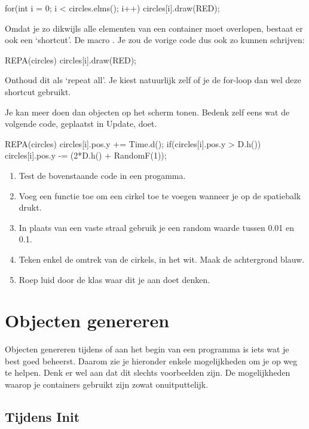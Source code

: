 \begin{code}
for(int i = 0; i < circles.elms(); i++)
{
  circles[i].draw(RED);
}
\end{code}

Omdat je zo dikwijls alle elementen van een container moet overlopen, bestaat er ook een `shortcut'. De macro . Je zou de vorige code dus ook zo kunnen schrijven:

\begin{code}
REPA(circles)
{
  circles[i].draw(RED);
}
\end{code}

Onthoud dit als `repeat all'. Je kiest natuurlijk zelf of je de for-loop dan wel deze shortcut gebruikt.

Je kan meer doen dan objecten op het scherm tonen. Bedenk zelf eens wat de volgende code, geplaatst in Update, doet.

\begin{code}
REPA(circles)
{
	circles[i].pos.y += Time.d();
	if(circles[i].pos.y > D.h()) {
	  circles[i].pos.y -= (2*D.h() + RandomF(1));
	}
}
\end{code}

\begin{exercise}
\begin{enumerate}
\item Test de bovenstaande code in een progamma.
\item Voeg een functie toe om een cirkel toe te voegen wanneer je op de spatiebalk drukt.
\item In plaats van een vaste straal gebruik je een random waarde tussen 0.01 en 0.1.
\item Teken enkel de omtrek van de cirkels, in het wit. Maak de achtergrond blauw.
\item Roep luid door de klas waar dit je aan doet denken.
\end{enumerate}
\end{exercise}

\section{Objecten genereren}
Objecten genereren tijdens of aan het begin van een programma is iets wat je best goed beheerst. Daarom zie je hieronder enkele mogelijkheden om je op weg te helpen. Denk er wel aan dat dit slechts voorbeelden zijn. De mogelijkheden waarop je containers gebruikt zijn zowat onuitputtelijk.

\subsection{Tijdens Init}

